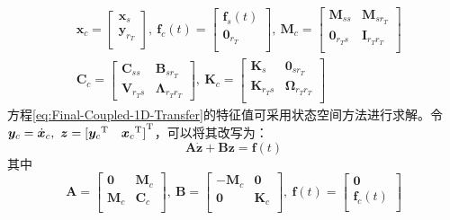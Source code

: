 \begin{displaymath}
	\begin{aligned}
		&\boldsymbol{x}_{c}=\left[ \begin{matrix}
		   \boldsymbol{x}_{s}  \\
		   \boldsymbol{y}_{r_T}  \\
		\end{matrix} \right],\ 
		\boldsymbol{f}_c(t)=\left[ \begin{matrix}
		   \boldsymbol{f}_{s}(t)  \\
		   \boldsymbol{0}_{r_T}  \\
		\end{matrix} \right],\ 
		\boldsymbol{M}_{c}=\left[ \begin{matrix}
		   \boldsymbol{M}_{ss} & \boldsymbol{M}_{sr_T}  \\
		   \boldsymbol{0}_{r_Ts} & \boldsymbol{I}_{r_Tr_T}  \\
		\end{matrix} \right]\\
		&\boldsymbol{C}_{c}=\left[ \begin{matrix}
		   \boldsymbol{C}_{ss} & \boldsymbol{B}_{sr_T}  \\
		   \boldsymbol{V}_{r_Ts} & \boldsymbol{\Lambda}_{r_Tr_T}
		\end{matrix} \right],\ 
		\boldsymbol{K}_{c}=\left[ \begin{matrix}
		   \boldsymbol{K}_{s} & \boldsymbol{0}_{sr_T}  \\
		   \boldsymbol{K}_{r_Ts} & \boldsymbol{\Omega}_{r_Tr_T}  \\
		\end{matrix} \right]
	\end{aligned}
\end{displaymath}
方程\eqref{eq:Final-Coupled-1D-Transfer}的特征值可采用状态空间方法进行求解。令$\boldsymbol{y}_c=\dot{\boldsymbol{x}}_c,\ \boldsymbol{z}={[ {\boldsymbol{y}_c}^{\ut}\quad {\boldsymbol{x}_c}^{\ut} ]}^{\ut}$，可以将其改写为：
\begin{equation}
	\boldsymbol{A}\dot{\boldsymbol{z}}+ \boldsymbol{B}\boldsymbol{z}=\boldsymbol{f}(t)
\end{equation}
其中
\begin{displaymath}
	\boldsymbol{A}=\left[ \begin{matrix}
	   \boldsymbol{0} & \boldsymbol{M}_{c}  \\
	   \boldsymbol{M}_{c} & \boldsymbol{C}_{c}  \\
	\end{matrix} \right],\ 
	\boldsymbol{B}=\left[ \begin{matrix}
	   -\boldsymbol{M}_{c} & \boldsymbol{0}  \\
	   \boldsymbol{0} & \boldsymbol{K}_{c}  \\
	\end{matrix} \right],\ 
	\boldsymbol{f}(t)=\left[ \begin{matrix}
	   \boldsymbol{0}  \\
	   \boldsymbol{f}_{c}(t)  \\
	\end{matrix} \right]
\end{displaymath}
